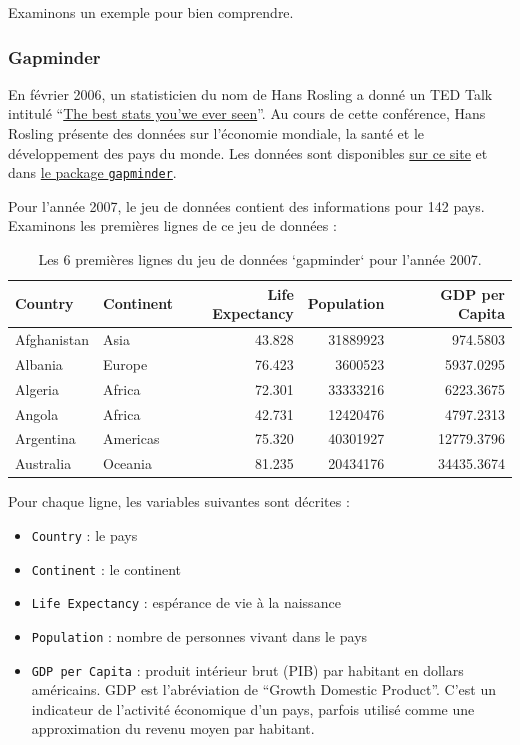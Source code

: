 \documentclass[a4paperpaper,]{article}
\providecommand{\tightlist}{%
  \setlength{\itemsep}{0pt}\setlength{\parskip}{0pt}}
\begin{document}
Examinons un exemple pour bien comprendre.

\hypertarget{gapminder}{%
\subsubsection{Gapminder}\label{gapminder}}

En février 2006, un statisticien du nom de Hans Rosling a donné un TED Talk intitulé ``\href{https://www.ted.com/talks/hans_rosling_shows_the_best_stats_you_ve_ever_seen}{The best stats you'we ever seen}''. Au cours de cette conférence, Hans Rosling présente des données sur l'économie mondiale, la santé et le développement des pays du monde. Les données sont disponibles \href{https://www.gapminder.org/tools/\#$chart-type=bubbles}{sur ce site} et dans \href{https://cran.r-project.org/web/packages/gapminder/index.html}{le package \texttt{gapminder}}.

Pour l'année 2007, le jeu de données contient des informations pour 142 pays. Examinons les premières lignes de ce jeu de données :

\begin{longtable}{llrrr}
\caption{\label{tab:unnamed-chunk-38}Les 6 premières lignes du jeu de données `gapminder` pour l'année 2007.}\\
\toprule
Country & Continent & Life Expectancy & Population & GDP per Capita\\
\midrule
Afghanistan & Asia & 43.828 & 31889923 & 974.5803\\
Albania & Europe & 76.423 & 3600523 & 5937.0295\\
Algeria & Africa & 72.301 & 33333216 & 6223.3675\\
Angola & Africa & 42.731 & 12420476 & 4797.2313\\
Argentina & Americas & 75.320 & 40301927 & 12779.3796\\
\addlinespace
Australia & Oceania & 81.235 & 20434176 & 34435.3674\\
\bottomrule
\end{longtable}

Pour chaque ligne, les variables suivantes sont décrites :

\begin{itemize}
\tightlist
\item
  \texttt{Country} : le pays
\item
  \texttt{Continent} : le continent
\item
  \texttt{Life\ Expectancy} : espérance de vie à la naissance
\item
  \texttt{Population} : nombre de personnes vivant dans le pays
\item
  \texttt{GDP\ per\ Capita} : produit intérieur brut (PIB) par habitant en dollars américains. GDP est l'abréviation de ``Growth Domestic Product''. C'est un indicateur de l'activité économique d'un pays, parfois utilisé comme une approximation du revenu moyen par habitant.
\end{itemize}
\end{document}
